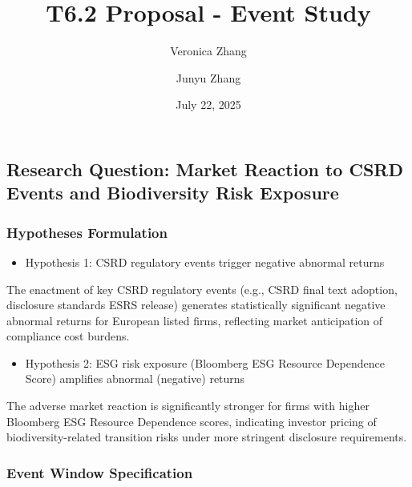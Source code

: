 \documentclass[
  letterpaper,
  DIV=11,
  numbers=noendperiod]{scrartcl}
\title{T6.2 Proposal - Event Study}
\author{Veronica Zhang \and Junyu Zhang}
\date{July 22, 2025}
\providecommand{\tightlist}{%
  \setlength{\itemsep}{0pt}\setlength{\parskip}{0pt}}
\begin{document}
\maketitle


\subsection{Research Question: Market Reaction to CSRD Events and
Biodiversity Risk
Exposure}\label{research-question-market-reaction-to-csrd-events-and-biodiversity-risk-exposure}

\subsubsection{Hypotheses Formulation}\label{hypotheses-formulation}

\begin{itemize}
\tightlist
\item
  Hypothesis 1: CSRD regulatory events trigger negative abnormal returns
\end{itemize}

The enactment of key CSRD regulatory events (e.g., CSRD final text
adoption, disclosure standards ESRS release) generates statistically
significant negative abnormal returns for European listed firms,
reflecting market anticipation of compliance cost burdens.

\begin{itemize}
\tightlist
\item
  Hypothesis 2: ESG risk exposure (Bloomberg ESG Resource Dependence
  Score) amplifies abnormal (negative) returns
\end{itemize}

The adverse market reaction is significantly stronger for firms with
higher Bloomberg ESG Resource Dependence scores, indicating investor
pricing of biodiversity-related transition risks under more stringent
disclosure requirements.

\subsubsection{Event Window
Specification}\label{event-window-specification}
\end{document}
